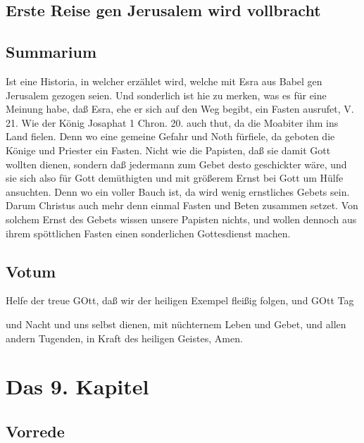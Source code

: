 \section{Erste Reise gen Jerusalem wird vollbracht}


\section{Summarium}

Ist eine Historia, in welcher erzählet wird, welche mit Esra aus Babel gen Jerusalem gezogen seien. Und sonderlich ist hie zu merken, was es für eine Meinung habe, daß Esra, ehe er sich auf den Weg begibt, ein Fasten ausrufet, V. 21. Wie der König Josaphat 1 Chron. 20. auch thut, da die Moabiter ihm ins Land fielen. Denn wo eine gemeine Gefahr und Noth fürfiele, da geboten die Könige und Priester ein Fasten. Nicht wie die Papisten, daß sie damit Gott wollten dienen, sondern daß jedermann zum Gebet desto geschickter wäre, und sie sich also für Gott demüthigten und mit größerem Ernst bei Gott um Hülfe ansuchten. Denn wo ein voller Bauch ist, da wird wenig ernstliches Gebets sein. Darum Christus auch mehr denn einmal Fasten und Beten zusammen setzet. Von solchem Ernst des Gebets wissen unsere Papisten nichts, und wollen dennoch aus ihrem spöttlichen Fasten einen sonderlichen Gottesdienst machen.

\section{Votum}

Helfe der treue GOtt, daß wir der heiligen Exempel fleißig folgen, und GOtt Tag

und Nacht und uns selbst dienen, mit nüchternem Leben und Gebet, und allen andern Tugenden, in Kraft des heiligen Geistes, Amen.

\chapter{Das 9. Kapitel}

\section{Vorrede}

